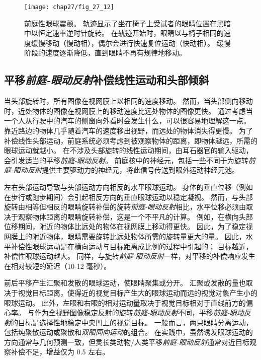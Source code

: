 \begin{figure}[htbp]
	\centering
	\texttt{[image: chap27/fig\_27\_12]}
	\caption{前庭性眼球震颤。
		轨迹显示了坐在椅子上受试者的眼睛位置在黑暗中以恒定速率逆时针旋转。
		在轨迹开始时，眼睛以与椅子相同的速度缓慢移动（慢动相），偶尔会进行快速复位运动（快动相）。
		缓慢阶段的速度逐渐降低，直到眼睛不再有规律地移动。}
	\label{fig:27_12}
\end{figure}



\subsection{平移\textit{前庭-眼动反射}补偿线性运动和头部倾斜}

当头部旋转时，所有图像在视网膜上以相同的速度移动。
然而，当头部侧向移动时，近处物体的图像在视网膜上的移动速度比远处物体的图像更快。
通过考虑当一个人从行驶中的汽车的侧窗向外看时会发生什么，可以很容易地理解这一点。
靠近路边的物体几乎随着汽车的速度移出视野，而远处的物体消失得更慢。
为了补偿线性头部运动，前庭系统必须考虑到被观察物体的距离，即物体越远，所需的眼球运动就越小。
在不涉及头部旋转的线性运动期间，由耳石器官的输入驱动，会引发适当的平移\textit{前庭-眼动反射}。
前庭核中的神经元，包括一些不同于为旋转\textit{前庭-眼动反射}提供主要驱动力的神经元，将此信号传送到眼外运动神经元池。


左右头部运动导致与头部运动方向相反的水平眼球运动。
身体的垂直位移（例如在步行或跑步期间）会引起相反方向的垂直眼球运动以稳定凝视。
然而，与头部旋转由相等但相反的眼睛旋转补偿的旋转\textit{前庭-眼动反射}相比，水平位移必须由取决于观察物体距离的眼睛旋转补偿，这是一个不平凡的计算。
例如，在横向头部位移期间，附近的物体比远处的物体在视网膜上移动得更快。
因此，为了稳定视网膜上的附近物体，眼睛需要旋转比远处物体所需的旋转量更大的量。
因此，水平补偿性眼球运动是在横向运动与目标距离成比例的过程中引起的；
目标越近，补偿性眼球运动越大。
同样，与旋转\textit{前庭-眼动反射}一样，对平移的补偿响应发生在相对较短的延迟（10-12 毫秒）。


前后平移产生汇聚和发散的眼球运动，使眼睛聚集或分开。
汇聚或发散的量也取决于视觉目标距离，使得近的视觉目标产生大的眼球运动而远的视觉对象产生小的眼球运动。
此外，左眼和右眼的相对运动量取决于视觉目标相对于直线前方的偏心率。
与作为全视野图像稳定反射的旋转\textit{前庭-眼动反射}不同，平移\textit{前庭-眼动反射}的目标是选择性地稳定中央凹上的视觉目标。
一般而言，两只眼睛分离运动，包括纯聚散运动或聚散和\textit{双眼同向运动}的组合。
在实践中，虽然诱发眼球运动的方向通常与几何预测一致，但灵长类动物/人类平移\textit{前庭-眼动反射}通常对近目标观察补偿不足，增益仅为 0.5 左右。


